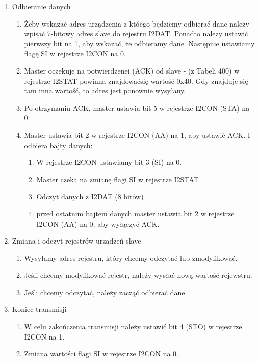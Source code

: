 \documentclass{article}
\begin{document}
\begin{enumerate}
    \item Odbieranie danych\\
    \begin{enumerate}
        \item Żeby wskazać adres urządzenia z któego będziemy odbierać dane należy wpisać 7-bitowy adres slave do rejestru I2DAT. Ponadto należy ustawić pierwszy bit na 1, aby wskazać, że odbieramy dane. Następnie ustawiamy flagę SI w rejestrze I2CON na 0.
        \item Master oczekuje na potwierdzenei (ACK) od slave - (z Tabeli 400) w rejestrze I2STAT powinna znajdowaćsię wartość 0x40. Gdy znajduje się tam inna wartość, to adres jest ponownie wysyłany.
        \item Po otrzymaniu ACK, master ustawia bit 5 w rejestrze I2CON (STA) na 0.
        \item Master ustawia bit 2 w rejestrze I2CON (AA) na 1, aby ustawić ACK. I odbiera bajty danych:
        \begin{enumerate}
            \item W rejestrze I2CON ustawiamy bit 3 (SI) na 0.
            \item Master czeka na zmianę flagi SI w rejestrze I2STAT
            \item Odczyt danych z I2DAT (8 bitów)
            \item przed ostatnim bajtem danych master ustawia bit 2 w rejestrze I2CON (AA) na 0, aby wyłączyć ACK.
        \end{enumerate}    
    \end{enumerate}    

    \label{sec:I2C_wysylanie_rejestrow}
    \item Zmiana i odczyt rejestrów urządzeń slave\\
    \begin{enumerate}
        \item Wysyłamy adres rejestru, który chcemy odczytać lub zmodyfikować.
        \item Jeśli chcemy modyfikować rejestr, należy wysłać nową wartość rejewstru.
        \item Jeśli chcemy odczytać, należy zacząć odbierać dane
        
    \end{enumerate}

    \item Koniec transmisji\\
    \begin{enumerate}
        \item W celu zakończenia transmisji należy ustawić bit 4 (STO) w rejestrze I2CON na 1.
        \item Zmiana wartości flagi SI w rejestrze I2CON na 0.
    \end{enumerate}


\end{enumerate}
\end{document}
